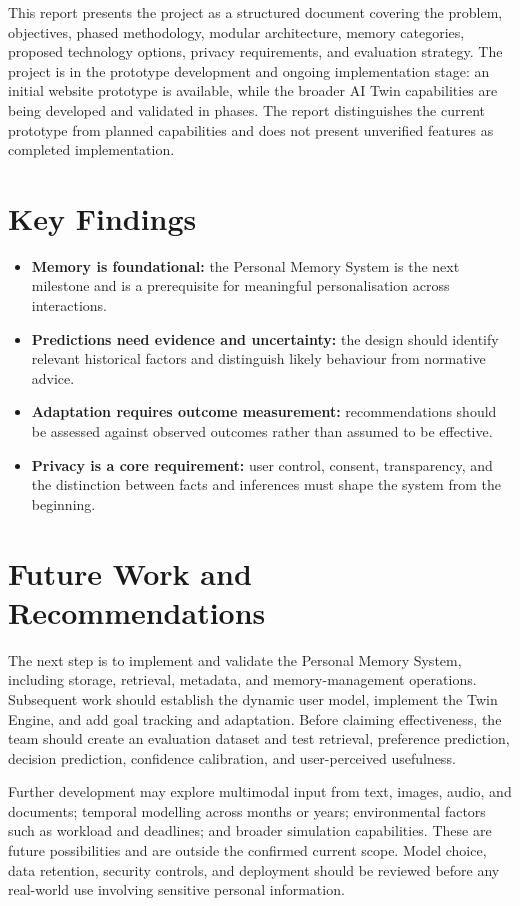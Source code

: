 \documentclass{tietreport}
\begin{document}
This report presents the project as a structured document covering the problem, objectives, phased methodology, modular architecture, memory categories, proposed technology options, privacy requirements, and evaluation strategy. The project is in the prototype development and ongoing implementation stage: an initial website prototype is available, while the broader AI Twin capabilities are being developed and validated in phases. The report distinguishes the current prototype from planned capabilities and does not present unverified features as completed implementation.

\section{Key Findings}
\begin{itemize}[leftmargin=*]
  \item \textbf{Memory is foundational:} the Personal Memory System is the next milestone and is a prerequisite for meaningful personalisation across interactions.
  \item \textbf{Predictions need evidence and uncertainty:} the design should identify relevant historical factors and distinguish likely behaviour from normative advice.
  \item \textbf{Adaptation requires outcome measurement:} recommendations should be assessed against observed outcomes rather than assumed to be effective.
  \item \textbf{Privacy is a core requirement:} user control, consent, transparency, and the distinction between facts and inferences must shape the system from the beginning.
\end{itemize}

\clearpage
{}
\section{Future Work and Recommendations}
The next step is to implement and validate the Personal Memory System, including storage, retrieval, metadata, and memory-management operations. Subsequent work should establish the dynamic user model, implement the Twin Engine, and add goal tracking and adaptation. Before claiming effectiveness, the team should create an evaluation dataset and test retrieval, preference prediction, decision prediction, confidence calibration, and user-perceived usefulness.

Further development may explore multimodal input from text, images, audio, and documents; temporal modelling across months or years; environmental factors such as workload and deadlines; and broader simulation capabilities. These are future possibilities and are outside the confirmed current scope. Model choice, data retention, security controls, and deployment should be reviewed before any real-world use involving sensitive personal information.
\end{document}
